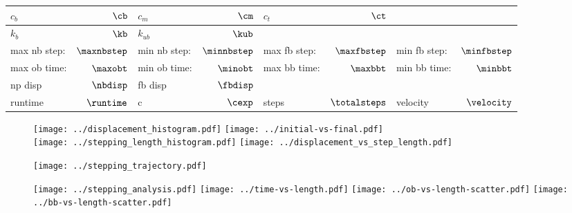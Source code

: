 \documentclass[]{article}
\begin{document}
\begin{table}[tbhp]
  \centering
  \begin{tabular}{|lr|lr|lr|lr|}
    \toprule
    $c_b$ & $\cb$ &
    $c_m$ & $\cm$ &
    $c_t$ & $\ct$ & &\\
    \midrule
    $k_b$ & $\kb$ &
    $k_{ub}$ & $\kub$ & & & &\\
    \midrule
    max nb step: & $\maxnbstep$ &
    min nb step: & $\minnbstep$ &
    max fb step: & $\maxfbstep$ &
    min fb step: & $\minfbstep$\\
    \midrule
    max ob time: & $\maxobt$ &
    min ob time: & $\minobt$ &
    max bb time: & $\maxbbt$ &
    min bb time: & $\minbbt$\\
    \midrule
    np disp & $\nbdisp$ &
    fb disp & $\fbdisp$ & & & &\\
    \midrule
    runtime & $\runtime$ &
    c & $\cexp$ &
    steps & $\totalsteps$ &
    velocity & $\velocity$\\
    \midrule
  \end{tabular}
\end{table}

\begin{figure}[tbhp]
  \centering
  \texttt{[image: ../displacement\_histogram.pdf]}%
  \texttt{[image: ../initial-vs-final.pdf]}\\
  \texttt{[image: ../stepping\_length\_histogram.pdf]}%
  \texttt{[image: ../displacement\_vs\_step\_length.pdf]}
\end{figure}

\begin{figure}[tbhp]
  \texttt{[image: ../stepping\_trajectory.pdf]}
\end{figure}

\begin{figure}[tbhp]
  \texttt{[image: ../stepping\_analysis.pdf]}%
  \texttt{[image: ../time-vs-length.pdf]}
  \texttt{[image: ../ob-vs-length-scatter.pdf]}%
  \texttt{[image: ../bb-vs-length-scatter.pdf]}
\end{figure}
\end{document}
